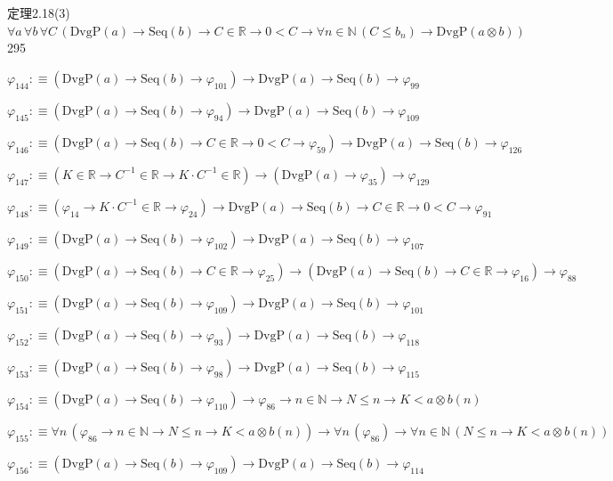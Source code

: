 \begin{fullproof}{定理2.18(3)}{$\forall a\,\forall b\,\forall C\,(\mathrm{DvgP}(a) \to \mathrm{Seq}(b) \to C \in \mathbb{R} \to 0 < C \to \forall n \in \mathbb{N}\,(C \leq b_{n}) \to \mathrm{DvgP}(a \otimes b))$}{295}
\begin{abbrevlist}
\item $\varphi_{144} :\equiv (\mathrm{DvgP}(a) \to \mathrm{Seq}(b) \to \varphi_{101}) \to \mathrm{DvgP}(a) \to \mathrm{Seq}(b) \to \varphi_{99}$
\item $\varphi_{145} :\equiv (\mathrm{DvgP}(a) \to \mathrm{Seq}(b) \to \varphi_{94}) \to \mathrm{DvgP}(a) \to \mathrm{Seq}(b) \to \varphi_{109}$
\item $\varphi_{146} :\equiv (\mathrm{DvgP}(a) \to \mathrm{Seq}(b) \to C \in \mathbb{R} \to 0 < C \to \varphi_{59}) \to \mathrm{DvgP}(a) \to \mathrm{Seq}(b) \to \varphi_{126}$
\item $\varphi_{147} :\equiv (K \in \mathbb{R} \to C^{-1} \in \mathbb{R} \to K \cdot C^{-1} \in \mathbb{R}) \to (\mathrm{DvgP}(a) \to \varphi_{35}) \to \varphi_{129}$
\item $\varphi_{148} :\equiv (\varphi_{14} \to K \cdot C^{-1} \in \mathbb{R} \to \varphi_{24}) \to \mathrm{DvgP}(a) \to \mathrm{Seq}(b) \to C \in \mathbb{R} \to 0 < C \to \varphi_{91}$
\item $\varphi_{149} :\equiv (\mathrm{DvgP}(a) \to \mathrm{Seq}(b) \to \varphi_{102}) \to \mathrm{DvgP}(a) \to \mathrm{Seq}(b) \to \varphi_{107}$
\item $\varphi_{150} :\equiv (\mathrm{DvgP}(a) \to \mathrm{Seq}(b) \to C \in \mathbb{R} \to \varphi_{25}) \to (\mathrm{DvgP}(a) \to \mathrm{Seq}(b) \to C \in \mathbb{R} \to \varphi_{16}) \to \varphi_{88}$
\item $\varphi_{151} :\equiv (\mathrm{DvgP}(a) \to \mathrm{Seq}(b) \to \varphi_{109}) \to \mathrm{DvgP}(a) \to \mathrm{Seq}(b) \to \varphi_{101}$
\item $\varphi_{152} :\equiv (\mathrm{DvgP}(a) \to \mathrm{Seq}(b) \to \varphi_{93}) \to \mathrm{DvgP}(a) \to \mathrm{Seq}(b) \to \varphi_{118}$
\item $\varphi_{153} :\equiv (\mathrm{DvgP}(a) \to \mathrm{Seq}(b) \to \varphi_{98}) \to \mathrm{DvgP}(a) \to \mathrm{Seq}(b) \to \varphi_{115}$
\item $\varphi_{154} :\equiv (\mathrm{DvgP}(a) \to \mathrm{Seq}(b) \to \varphi_{110}) \to \varphi_{86} \to n \in \mathbb{N} \to N \leq n \to K < a \otimes b(n)$
\item $\varphi_{155} :\equiv \forall n\,(\varphi_{86} \to n \in \mathbb{N} \to N \leq n \to K < a \otimes b(n)) \to \forall n\,(\varphi_{86}) \to \forall n \in \mathbb{N}\,(N \leq n \to K < a \otimes b(n))$
\item $\varphi_{156} :\equiv (\mathrm{DvgP}(a) \to \mathrm{Seq}(b) \to \varphi_{109}) \to \mathrm{DvgP}(a) \to \mathrm{Seq}(b) \to \varphi_{114}$

\end{abbrevlist}
\end{fullproof}
